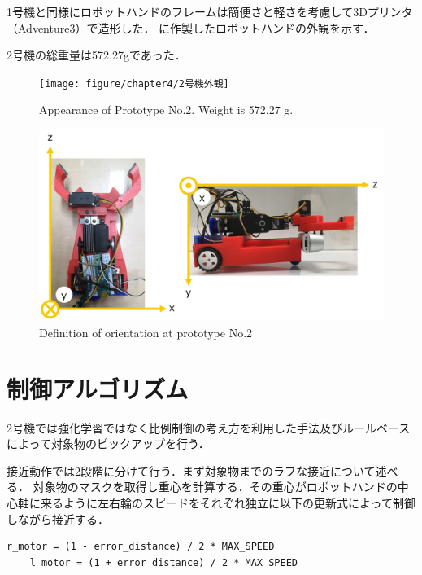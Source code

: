 1号機と同様にロボットハンドのフレームは簡便さと軽さを考慮して3Dプリンタ（Adventure3）で造形した．
に作製したロボットハンドの外観を示す．

2号機の総重量は572.27gであった．

\begin{figure}
    \centering
    \begin{minipage}{\linewidth}
        \centering
        \texttt{[image: figure/chapter4/2号機外観]}
        \caption{Appearance of Prototype No.2. Weight is 572.27 g.}
        \label{fig:2号機外観}
    \end{minipage}
    \begin{minipage}{\linewidth}
        \centering
        \includegraphics[width=0.9\linewidth]{figure/chapter4/2号機向き}
        \caption{Definition of orientation at prototype No.2}
        \label{fig:2号機向き}
    \end{minipage}
\end{figure}


\section{制御アルゴリズム}
2号機では強化学習ではなく比例制御の考え方を利用した手法及びルールベースによって対象物のピックアップを行う．

接近動作では2段階に分けて行う．まず対象物までのラフな接近について述べる．
対象物のマスクを取得し重心を計算する．その重心がロボットハンドの中心軸に来るように左右輪のスピードをそれぞれ独立に以下の更新式によって制御しながら接近する．

\begin{lstlisting}[caption=接近アルゴリズム, label=code:motor]
    r_motor = (1 - error_distance) / 2 * MAX_SPEED
    l_motor = (1 + error_distance) / 2 * MAX_SPEED
\end{lstlisting}

